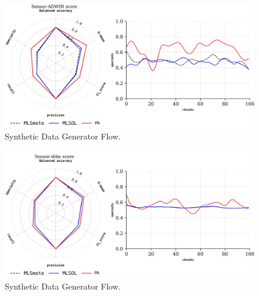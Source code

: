 \begin{figure}[!ht]
	\centering
	\includegraphics[width=1\linewidth]{4_Imbalanced/figures/exp_3.png}
	\caption{Synthetic Data Generator Flow.}
	\label{fig:4_first_proposal_result_exp_3}
\end{figure}

\begin{figure}[!ht]
	\centering
	\includegraphics[width=1\linewidth]{4_Imbalanced/figures/exp_4.png}
	\caption{Synthetic Data Generator Flow.}
	\label{fig:4_first_proposal_result_exp_4}
\end{figure}


